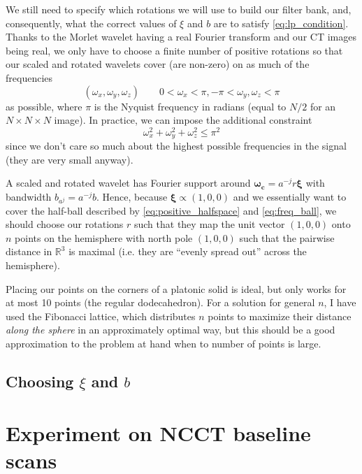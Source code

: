 \documentclass[twocolumn, openany, oneside, article]{memoir}
\begin{document}
We still need to specify which rotations we will use to build our filter bank, and, consequently, what the correct
values of $\xi$ and $b$ are to satisfy \autoref{eq:lp_condition}. Thanks to the Morlet wavelet having a real
Fourier transform and our CT images being real, we only have to choose a finite number of positive rotations so that our
scaled and rotated wavelets cover (are non-zero) on as much of the frequencies
\begin{equation}\label{eq:positive_halfspace}
(\omega_x, \omega_y, \omega_z) \qquad 0 < \omega_x < \pi, -\pi < \omega_y, \omega_z < \pi
\end{equation}
as possible, where $\pi$ is the Nyquist frequency in radians (equal to $N/2$ for an $N \times N \times N$ image). In practice, we can
impose the additional constraint
\begin{equation}\label{eq:freq_ball}
    \omega_{x}^2 + \omega_{y}^2 + \omega_{z}^2 \leq \pi^2
\end{equation}
since we don't care so much about the highest possible frequencies in the signal (they are very small anyway).

A scaled and rotated wavelet has Fourier support around $\bm{\omega_c} = a^{-j}r\bm{\xi}$ with bandwidth $b_{a^j} =
a^{-j}b$. Hence, because $\bm{\xi} \propto (1, 0, 0)$ and we essentially want to cover the half-ball described by
\autoref{eq:positive_halfspace} and \autoref{eq:freq_ball}, we should choose our rotations $r$ such that they map the
unit vector $(1, 0, 0)$ onto $n$ points on the hemisphere with north pole $(1, 0, 0)$ such that the pairwise distance in
$\mathbb{R}^3$ is maximal (i.e. they are \enquote{evenly spread out} across the hemisphere).

Placing our points on the corners of a platonic solid is ideal, but only works for at most 10 points (the regular
dodecahedron). For a solution for general $n$, I have used the Fibonacci lattice, which distributes $n$ points to
maximize their distance \emph{along the sphere} in an approximately optimal way, but this should be a good approximation
to the problem at hand when to number of points is large.


\section{Choosing $\xi$ and $b$}


\chapter{Experiment on NCCT baseline scans}
\end{document}
